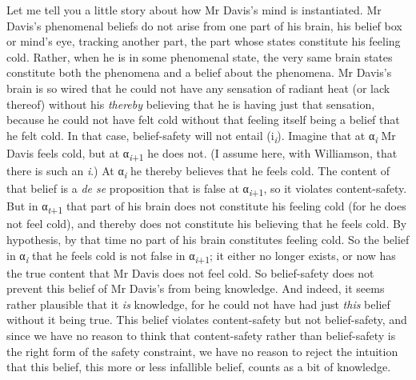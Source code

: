 \documentclass[
  11pt,
  letterpaper,
  DIV=11,
  numbers=noendperiod,
  twoside]{scrartcl}
\renewcommand{\textsc}[1]{{\scfont #1}}
\begin{document}
Let me tell you a little story about how Mr Davis's mind is
instantiated. Mr Davis's phenomenal beliefs do not arise from one part
of his brain, his belief box or mind's eye, tracking another part, the
part whose states constitute his feeling cold. Rather, when he is in
some phenomenal state, the very same brain states constitute both the
phenomena and a belief about the phenomena. Mr Davis's brain is so wired
that he could not have any sensation of radiant heat (or lack thereof)
without his \emph{thereby} believing that he is having just that
sensation, because he could not have felt cold without that feeling
itself being a belief that he felt cold. In that case, belief-safety
will not entail (\textsc{i}\textsubscript{\emph{i}}). Imagine that at
α\textsubscript{\emph{i}} Mr Davis feels cold, but at
α\textsubscript{\emph{i}+1} he does not. (I assume here, with
Williamson, that there is such an \emph{i}.) At
α\textsubscript{\emph{i}} he thereby believes that he feels cold. The
content of that belief is a \emph{de se} proposition that is false at
α\textsubscript{\emph{i}+1}, so it violates content-safety. But in
α\textsubscript{\emph{t}+1} that part of his brain does not constitute
his feeling cold (for he does not feel cold), and thereby does not
constitute his believing that he feels cold. By hypothesis, by that time
no part of his brain constitutes feeling cold. So the belief in
α\textsubscript{\emph{i}} that he feels cold is not false in
α\textsubscript{\emph{i}+1}; it either no longer exists, or now has the
true content that Mr Davis does not feel cold. So belief-safety does not
prevent this belief of Mr Davis's from being knowledge. And indeed, it
seems rather plausible that it \emph{is} knowledge, for he could not
have had just \emph{this} belief without it being true. This belief
violates content-safety but not belief-safety, and since we have no
reason to think that content-safety rather than belief-safety is the
right form of the safety constraint, we have no reason to reject the
intuition that this belief, this more or less infallible belief, counts
as a bit of knowledge.
\end{document}
